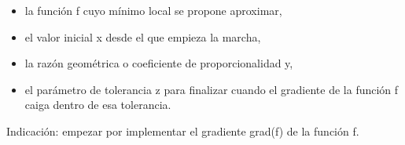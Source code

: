 \documentclass[11pt]{article}
\providecommand{\tightlist}{%
      \setlength{\itemsep}{0pt}\setlength{\parskip}{0pt}}
\begin{document}
\begin{itemize}
\tightlist
\item
  la función f cuyo mínimo local se propone aproximar,\\
\item
  el valor inicial x desde el que empieza la marcha,\\
\item
  la razón geométrica o coeficiente de proporcionalidad y,\\
\item
  el parámetro de tolerancia z para finalizar cuando el gradiente de la
  función f caiga dentro de esa tolerancia.\\
\end{itemize}

Indicación: empezar por implementar el gradiente grad(f) de la función
f.\\
\end{document}
